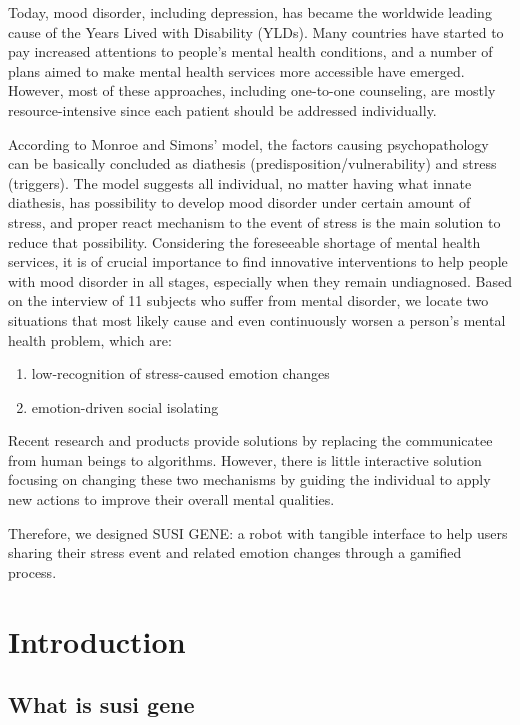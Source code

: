 \documentclass[manuscript,screen]{acmart}
\begin{document}
Today, mood disorder, including depression, has became the worldwide leading cause of the Years Lived with Disability (YLDs). Many countries have started to pay increased attentions to people’s mental health conditions, and a number of plans aimed to make mental health services more accessible have emerged. However, most of these approaches, including one-to-one counseling, are mostly resource-intensive since each patient should be addressed individually.\cite{world2019special}

According to Monroe and Simons' model, the factors causing psychopathology can be basically concluded as diathesis (predisposition/vulnerability) and stress (triggers).\cite{monroe1991diathesis}
The model suggests all individual, no matter having what innate diathesis, has possibility to develop mood disorder under certain amount of stress, and proper react mechanism to the event of stress is the main solution to reduce that possibility. Considering the foreseeable shortage of mental health services, it is of crucial importance to find innovative interventions to help people with mood disorder in all stages, especially when they remain undiagnosed. Based on the interview of 11 subjects who suffer from mental disorder, we locate two situations that most likely cause and even continuously worsen a person’s mental health problem, which are:

\begin{enumerate}
  \item low-recognition of stress-caused emotion changes
  \item emotion-driven social isolating
\end{enumerate} 

Recent research and products provide solutions by replacing the communicatee from human beings to algorithms. However, there is little interactive solution focusing on changing these two mechanisms by guiding the individual to apply new actions to improve their overall mental qualities.

Therefore, we designed SUSI GENE: a robot with tangible interface to help users sharing their stress event and related emotion changes through a gamified process.

\section{Introduction}

\subsection{What is susi gene}
\end{document}
